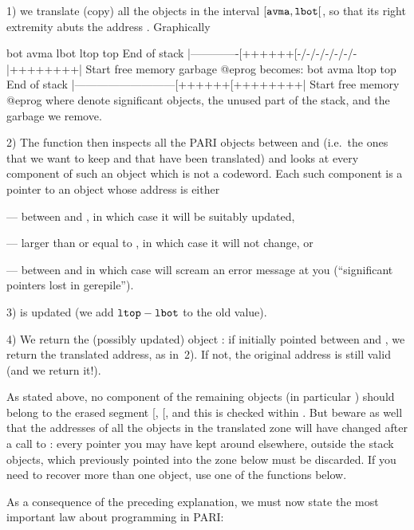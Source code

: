 1) we translate (copy) all the objects in the interval
$[{\tt avma}, {\tt lbot}[$, so that its right extremity abuts the address
. Graphically

\vbox{\bprog
             bot           avma   lbot          ltop     top
End of stack  |-------------[++++++[-/-/-/-/-/-/-|++++++++|  Start
                free memory            garbage
@eprog
\noindent becomes:
\bprog
             bot                         avma   ltop     top
End of stack  |---------------------------[++++++[++++++++|  Start
                       free memory
@eprog
}
\noindent where \kbd{++} denote significant objects, \kbd{--} the unused part
of the stack, and \kbd{-/-} the garbage we remove.

2) The function then inspects all the PARI objects between  and
 (i.e.~the ones that we want to keep and that have been translated)
and looks at every component of such an object which is not a codeword. Each
such component is a pointer to an object whose address is either

--- between  and , in which case it will be suitably
updated,

--- larger than or equal to , in which case it will not change, or

--- between  and  in which case  will
scream an error message at you (``significant pointers lost in gerepile'').

3)  is updated (we add ${\tt ltop} - {\tt lbot}$ to the old value).

4) We return the (possibly updated) object : if  initially
pointed between  and , we return the translated
address, as in~2). If not, the original address is still valid (and we return
it!).

As stated above, no component of the remaining objects (in particular
) should belong to the erased segment [, [, and
this is checked within . But beware as well that the addresses
of all the objects in the translated zone will have changed after a call to
: every pointer you may have kept around elsewhere, outside the
stack objects, which previously pointed into the zone below 
must be discarded. If you need to recover more than one object, use one of
the  functions below.

As a consequence of the preceding explanation, we must now state the most
important law about programming in PARI:

